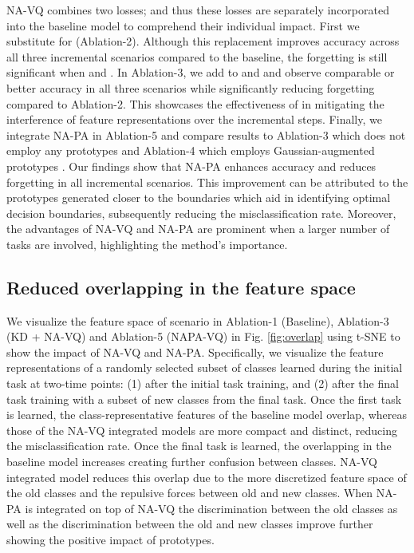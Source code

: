 \documentclass[10pt,twocolumn,letterpaper]{article}
\begin{document}
  NA-VQ combines two losses;  and  thus these losses are separately incorporated into the baseline model to comprehend their individual impact. First we substitute  for  (Ablation-2). Although this replacement improves accuracy across all three incremental scenarios compared to the baseline, the forgetting is still significant when  and . In Ablation-3, we add  to  and  and observe comparable or better accuracy in all three scenarios while significantly reducing forgetting compared to  Ablation-2. This showcases the effectiveness of  in mitigating the interference of feature representations over the incremental steps. Finally, we integrate NA-PA in Ablation-5 and compare results to Ablation-3 which does not employ any prototypes and Ablation-4 which employs Gaussian-augmented prototypes  \cite{Zhu2021PrototypeLearning}. Our findings show that NA-PA enhances accuracy and reduces forgetting in all incremental scenarios. This improvement can be attributed to the prototypes generated closer to the boundaries which aid in identifying optimal decision boundaries, subsequently reducing the misclassification rate. Moreover, the advantages of NA-VQ and NA-PA are prominent when a larger number of tasks are involved, highlighting the method's importance.
\subsection{Reduced overlapping in the feature space}

We visualize the feature space of  scenario in Ablation-1 (Baseline), Ablation-3 (KD + NA-VQ) and Ablation-5  (NAPA-VQ) in Fig. \ref{fig:overlap} using t-SNE \cite{derMaaten2008VisualizingT-SNE.} to show the impact of NA-VQ and NA-PA. Specifically, we visualize the feature representations of a randomly selected subset of classes learned during the initial task at two-time points: (1) after the initial task training, and (2) after the final task training with a subset of new classes from the final task. Once the first task is learned, the class-representative features of the baseline model overlap, whereas those of the NA-VQ integrated models are more compact and distinct, reducing the misclassification rate. Once the final task is learned, the overlapping in the baseline model increases creating further confusion between classes. NA-VQ integrated model reduces this overlap due to the more discretized feature space of the old classes and the repulsive forces between old and new classes. When NA-PA is integrated on top of NA-VQ the discrimination between the old classes as well as the discrimination between the old and new classes improve further showing the positive impact of prototypes.
\end{document}
